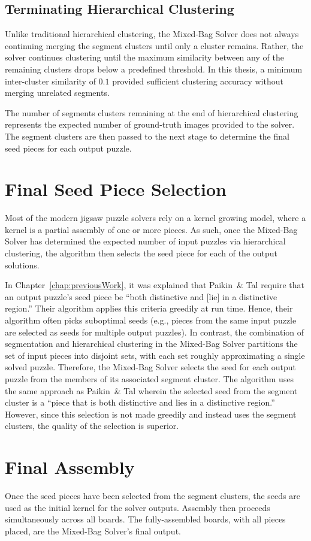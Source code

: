 \subsection{Terminating Hierarchical Clustering}

Unlike traditional hierarchical clustering, the Mixed-Bag Solver does not always continuing merging the segment clusters  until only a cluster remains. Rather, the solver continues clustering until the maximum similarity between any of the remaining clusters drops below a predefined threshold.  In this thesis, a minimum inter-cluster similarity of $0.1$ provided sufficient clustering accuracy without merging unrelated segments.

The number of segments clusters remaining at the end of hierarchical clustering represents the expected number of ground-truth images provided to the solver.  The segment clusters are then passed to the next stage to determine the final seed pieces for each output puzzle.

\section{Final Seed Piece Selection}\label{sec:finalSeedPiece}

Most of the modern jigsaw puzzle solvers \cite{pomeranz2011, sholomon2013, paikin2015} rely on a kernel growing model, where a kernel is a partial assembly of one or more pieces.  As such, once the Mixed-Bag Solver has determined the expected number of input puzzles via hierarchical clustering, the algorithm then selects the seed piece for each of the output solutions. 

In Chapter~\ref{chap:previousWork}, it was explained that Paikin~\& Tal require that an output puzzle's seed piece be ``both distinctive and [lie] in a distinctive region.''  Their algorithm applies this criteria greedily at run time.  Hence, their algorithm often picks suboptimal seeds (e.g., pieces from the same input puzzle are selected as seeds for multiple output puzzles).  In contrast, the combination of segmentation and hierarchical clustering in the Mixed-Bag Solver partitions the set of input pieces into disjoint sets, with each set roughly approximating a single solved puzzle.  Therefore, the Mixed-Bag Solver selects the seed for each output puzzle from the members of its associated segment cluster.  The algorithm uses the same approach as Paikin~\& Tal wherein the selected seed from the segment cluster is a ``piece that is both distinctive and lies in a distinctive region.''  However, since this selection is not made greedily and instead uses the segment clusters, the quality of the selection is superior.

\section{Final Assembly}

Once the seed pieces have been selected from the segment clusters, the seeds are used as the initial kernel for the solver outputs.  Assembly then proceeds simultaneously across all boards.  The fully-assembled boards, with all pieces placed, are the Mixed-Bag Solver's final output.